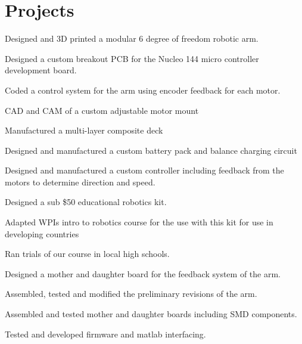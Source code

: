 \documentclass[]{deedy-resume-openfont}
\begin{document}
\begin{minipage}[t]{0.66\textwidth} 


\section{Projects}

\vspace{\topsep}
\begin{tightemize} 
\item Designed and 3D printed a modular 6 degree of freedom robotic arm.
\item Designed a custom breakout PCB for the Nucleo 144 micro controller development board.
\item Coded a control system for the arm using encoder feedback for each motor.
\end{tightemize}

\begin{tightemize} 
\item CAD and CAM of a custom adjustable motor mount
\item Manufactured a multi-layer composite deck
\item Designed and manufactured a custom battery pack and balance charging circuit
\item Designed and manufactured a custom controller including feedback from the motors to determine direction and speed.
\end{tightemize}

\begin{tightemize} 
\item Designed a sub \$50 educational robotics kit. 
\item Adapted WPIs intro to robotics course for the use with this kit for use in developing countries
\item Ran trials of our course in local high schools.
\end{tightemize}

\begin{tightemize} 
\item Designed a mother and daughter board for the feedback system of the arm.
\item Assembled, tested and modified the preliminary revisions of the arm.
\item Assembled and tested mother and daughter boards including SMD components.
\item Tested and developed firmware and matlab interfacing.
\end{tightemize}


\end{minipage}
\end{document}
